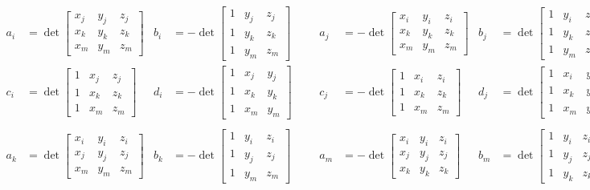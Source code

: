 \documentclass[hidelinks]{article}
\begin{document}
\begin{align*}
a_i &= \det \begin{bmatrix} x_j & y_j & z_j \\ x_k & y_k & z_k \\ x_m & y_m & z_m \end{bmatrix}& b_i &= - \det \begin{bmatrix} 1 & y_j & z_j \\ 1 & y_k & z_k \\ 1 & y_m & z_m \end{bmatrix} & & & a_j &= - \det \begin{bmatrix} x_i & y_i & z_i \\ x_k & y_k & z_k \\ x_m & y_m & z_m \end{bmatrix}& b_j &= \det \begin{bmatrix} 1 & y_i & z_i \\ 1 & y_k & z_k \\ 1 & y_m & z_m \end{bmatrix}\\
c_i &= \det \begin{bmatrix} 1 & x_j & z_j \\ 1 & x_k & z_k \\ 1 & x_m & z_m \end{bmatrix} & d_i &= - \det \begin{bmatrix} 1 & x_j & y_j \\ 1 & x_k & y_k \\ 1 & x_m & y_m \end{bmatrix}      & & & c_j &= - \det \begin{bmatrix} 1 & x_i & z_i \\ 1 & x_k & z_k \\ 1 & x_m & z_m \end{bmatrix}& d_j &= \det \begin{bmatrix} 1 & x_i & y_i \\ 1 & x_k & y_k \\ 1 & x_m & y_m \end{bmatrix}\\ \\
a_k &= \det \begin{bmatrix} x_i & y_i & z_i \\ x_j & y_j & z_j \\ x_m & y_m & z_m \end{bmatrix}& b_k &= - \det \begin{bmatrix} 1 & y_i & z_i \\ 1 & y_j & z_j \\ 1 & y_m & z_m\end{bmatrix}& & & a_m &= - \det \begin{bmatrix} x_i & y_i & z_i \\ x_j & y_j & z_j \\ x_k & y_k & z_k \end{bmatrix}& b_m &= \det \begin{bmatrix} 1 & y_i & z_i \\ 1 & y_j & z_j \\ 1 & y_k & z_k\end{bmatrix} \\

\end{align*}
\end{document}
